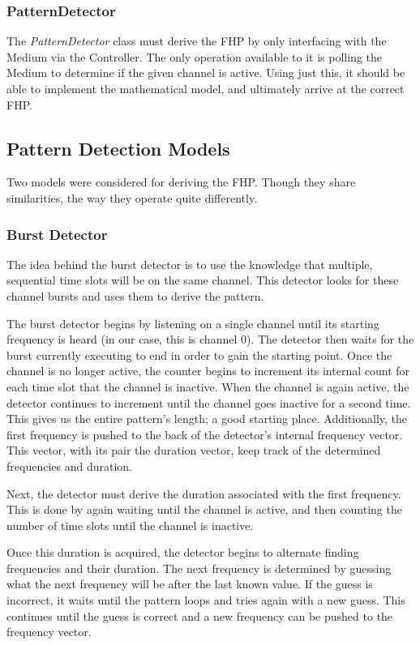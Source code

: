 \documentclass[conference]{IEEEtran}
\begin{document}
\subsubsection{PatternDetector}

The \textit{PatternDetector} class must derive the FHP by only interfacing with the Medium via the Controller.
The only operation available to it is polling the Medium to determine if the given channel is active.
Using just this, it should be able to implement the mathematical model, and ultimately arrive at the correct FHP.


\subsection{Pattern Detection Models}

Two models were considered for deriving the FHP.
Though they share similarities, the way they operate quite differently.

\subsubsection{Burst Detector}

The idea behind the burst detector is to use the knowledge that multiple, sequential time slots will be on the same channel.
This detector looks for these channel bursts and uses them to derive the pattern.

The burst detector begins by listening on a single channel until its starting frequency is heard (in our case, this is channel 0).
The detector then waits for the burst currently executing to end in order to gain the starting point.
Once the channel is no longer active, the counter begins to increment its internal count for each time slot that the channel is inactive.
When the channel is again active, the detector continues to increment until the channel goes inactive for a second time.
This gives us the entire pattern's length; a good starting place.
Additionally, the first frequency is pushed to the back of the detector's internal frequency vector.
This vector, with its pair the duration vector, keep track of the determined frequencies and duration.

Next, the detector must derive the duration associated with the first frequency.
This is done by again waiting until the channel is active, and then counting the number of time slots until the channel is inactive.

Once this duration is acquired, the detector begins to alternate finding frequencies and their duration.
The next frequency is determined by guessing what the next frequency will be after the last known value.
If the guess is incorrect, it waits until the pattern loops and tries again with a new guess.
This continues until the guess is correct and a new frequency can be pushed to the frequency vector.
\end{document}
